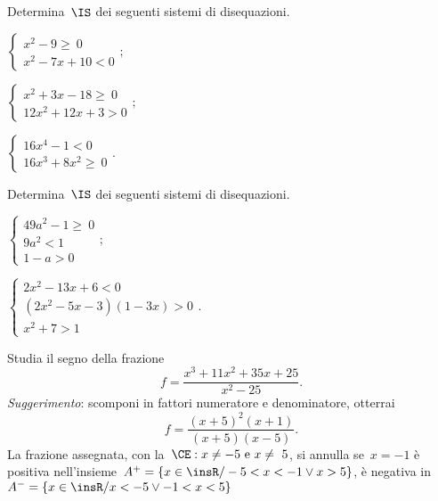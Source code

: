 \begin{esercizio}[\Ast]
 \label{ese:21.52}
 Determina~\(\IS\) dei seguenti sistemi di disequazioni.
 \begin{multicols}{3}
 \begin{enumeratea}
 \item \(\left\{\begin{array}{l}
  x^{2}-9\ge~0\\
  x^{2}-7x+10<0
           \end{array}\right.;\)
\item \(\left\{\begin{array}{l}
  x^{2}+3x-18\ge~0\\
  12x^{2}+12x+3>0
           \end{array}\right.;\)
\item \(\left\{\begin{array}{l}
  16x^{4}-1<0 \\
  16x^{3}+8x^{2}\ge~0 \end{array}\right.. \)
 \end{enumeratea}
 \end{multicols}
\end{esercizio}

\begin{esercizio}[\Ast]
 \label{ese:21.53}
 Determina~\(\IS\) dei seguenti sistemi di disequazioni.
 \begin{multicols}{2}
 \begin{enumeratea}
 \item \(\left\{\begin{array}{l}
  49a^{2}-1\ge~0\\
  9a^{2}<1\\
  1-a>0
           \end{array}\right.;\)

\item \(\left\{\begin{array}{l}
          2x^{2}-13x+6<0\\
          (2x^{2}-5x-3)(1-3x)>0\\
          x^{2}+7>1
           \end{array}\right..\)
 \end{enumeratea}
 \end{multicols}
\end{esercizio}

\begin{esercizio}
\label{ese:21.54}
Studia il segno della frazione
\[f=\dfrac{x^{3}+11x^{2}+35x+25}{x^{2}-25}.\]
\emph{Suggerimento}: scomponi in fattori numeratore e denominatore, otterrai
\[ f=\frac{(x+5)^{2}(x+1)}{(x+5)(x-5)}.\]
% 
% 
La frazione assegnata, con la~\(\CE: x\neq -5\text{ e }x\neq~5\), si annulla se~\(x=-1\)
è positiva nell'insieme~\(A^{+}=\left\{x\in \insR/-5<x<-1\vee x>5\right\}\), è negativa in
\(A^{-}=\left\{x\in\insR/x<-5\vee -1<x<5\right\}\)
\end{esercizio}

